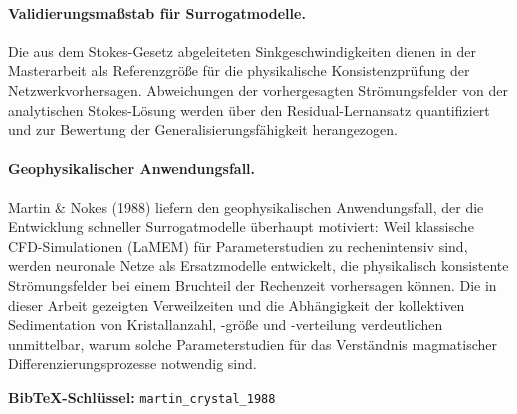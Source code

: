 \documentclass[a4paper,12pt]{article}
\begin{document}
\paragraph{Validierungsmaßstab für Surrogatmodelle.}
Die aus dem Stokes-Gesetz abgeleiteten Sinkgeschwindigkeiten dienen in der
Masterarbeit als Referenzgröße für die physikalische Konsistenzprüfung der
Netzwerkvorhersagen. Abweichungen der vorhergesagten Strömungsfelder von der
analytischen Stokes-Lösung werden über den Residual-Lernansatz quantifiziert
und zur Bewertung der Generalisierungsfähigkeit herangezogen.

\paragraph{Geophysikalischer Anwendungsfall.}
Martin \& Nokes (1988) liefern den geophysikalischen Anwendungsfall, der die
Entwicklung schneller Surrogatmodelle überhaupt motiviert: Weil klassische
CFD-Simulationen (LaMEM) für Parameterstudien zu rechenintensiv sind, werden
neuronale Netze als Ersatzmodelle entwickelt, die physikalisch konsistente
Strömungsfelder bei einem Bruchteil der Rechenzeit vorhersagen können. Die in
dieser Arbeit gezeigten Verweilzeiten und die Abhängigkeit der kollektiven
Sedimentation von Kristallanzahl, -größe und -verteilung verdeutlichen
unmittelbar, warum solche Parameterstudien für das Verständnis magmatischer
Differenzierungsprozesse notwendig sind.

\bigskip
\noindent\textbf{BibTeX-Schlüssel:} \texttt{martin\_crystal\_1988}
\end{document}
